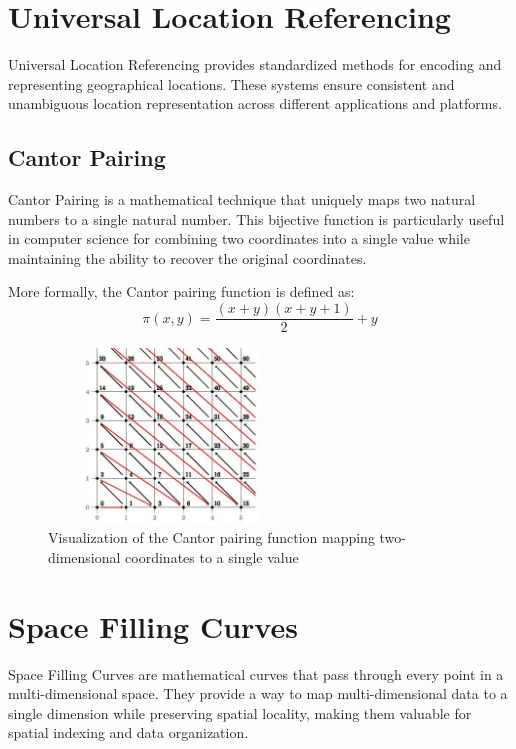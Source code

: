 \documentclass[12pt,a4paper,twoside]{book}
\begin{document}
\section{Universal Location Referencing}
Universal Location Referencing provides standardized methods for encoding and representing geographical locations. These systems ensure consistent and unambiguous location representation across different applications and platforms.

\subsection{Cantor Pairing}
Cantor Pairing is a mathematical technique that uniquely maps two natural numbers to a single natural number. This bijective function is particularly useful in computer science for combining two coordinates into a single value while maintaining the ability to recover the original coordinates.

More formally, the Cantor pairing function is defined as:
\[
    \pi(x, y) = \frac{(x + y)(x + y + 1)}{2} + y
\]

\vspace{5mm}

\begin{figure}[h]
    \centering
    \includegraphics[width=6.5cm,height=4.7cm]{img/cantor-pairing.jpg}
    \caption{Visualization of the Cantor pairing function mapping two-dimensional coordinates to a single value}
    \label{fig:cantor}
\end{figure}

\vspace{5mm}

\section{Space Filling Curves}
Space Filling Curves are mathematical curves that pass through every point in a multi-dimensional space. They provide a way to map multi-dimensional data to a single dimension while preserving spatial locality, making them valuable for spatial indexing and data organization.
\end{document}
